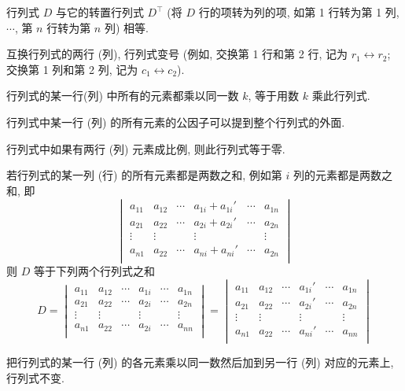 \begin{theorem}
    行列式 $ D $ 与它的转置行列式 $ D^{\top} $ (将 $ D $ 行的项转为列的项, 如第 1 行转为第 1 列, $ \cdots $, 第 $ n $ 行转为第 $ n $ 列) 相等.
\end{theorem}
\begin{theorem}
    互换行列式的两行 (列), 行列式变号 (例如, 交换第 1 行和第 2 行, 记为 $ r_{1} \leftrightarrow r_{2} $; 交换第 1 列和第 2 列, 
    记为 $ c_{1} \leftrightarrow c_{2} $).
\end{theorem}
\begin{theorem}
    行列式的某一行(列) 中所有的元素都乘以同一数 $ k $, 等于用数 $ k $ 乘此行列式.
\end{theorem}
\begin{inference}
    行列式中某一行 (列) 的所有元素的公因子可以提到整个行列式的外面.
\end{inference}
\begin{theorem}
    行列式中如果有两行 (列) 元素成比例, 则此行列式等于零.
\end{theorem}
\begin{theorem}
    若行列式的某一列 (行) 的所有元素都是两数之和, 例如第 $ i $ 列的元素都是两数之和, 即
    $$\begin{vmatrix}
            a_{11} & a_{12} & \cdots & a_{1i}+a_{1i}' & \cdots & a_{1n} \\
            a_{21} & a_{22} & \cdots & a_{2i}+a_{2i}' & \cdots & a_{2n} \\
            \vdots & \vdots &        & \vdots         &        & \vdots \\
            a_{n1} & a_{22} & \cdots & a_{ni}+a_{ni}' & \cdots & a_{2n} \\
        \end{vmatrix}$$
    则 $D$ 等于下列两个行列式之和
    $$D=\begin{vmatrix}
            a_{11} & a_{12} & \cdots & a_{1i} & \cdots & a_{1n} \\
            a_{21} & a_{22} & \cdots & a_{2i} & \cdots & a_{2n} \\
            \vdots & \vdots &        & \vdots &        & \vdots \\
            a_{n1} & a_{22} & \cdots & a_{2i} & \cdots & a_{nn} \\
        \end{vmatrix}
        =\begin{vmatrix}
            a_{11} & a_{12} & \cdots & a_{1i}' & \cdots & a_{1n} \\
            a_{21} & a_{22} & \cdots & a_{2i}' & \cdots & a_{2n} \\
            \vdots & \vdots &        & \vdots  &        & \vdots \\
            a_{n1} & a_{22} & \cdots & a_{ni}' & \cdots & a_{nn} \\
        \end{vmatrix}$$
\end{theorem}
\begin{theorem}
    把行列式的某一行 (列) 的各元素乘以同一数然后加到另一行 (列) 对应的元素上, 行列式不变.
\end{theorem}

